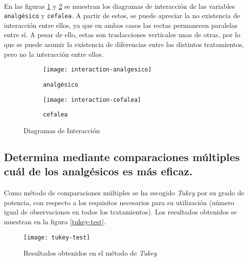 \documentclass[11pt]{article}
\begin{document}
      \paragraph{}
      En las figuras \ref{fig:interaction-analgesico} y \ref{fig:interaction-cefalea} se muestran los diagramas de interacción de las variables \texttt{analgésico} y \texttt{cefalea}. A partir de estos, se puede apreciar la no existencia de interacción entre ellos, ya que en ambos casos las rectas permanecen paralelas entre sí. A pesar de ello, estas son traslacciones verticales unas de otras, por lo que se puede asumir la existencia de diferencias entre las distintos tratamientos, pero no la interacción entre ellos.

      \begin{figure}[!h]
        \centering
        \begin{subfigure}{.5\textwidth}
          \centering
          \texttt{[image: interaction-analgesico]}
          \caption{\texttt{analgésico}}
          \label{fig:interaction-analgesico}
        \end{subfigure}%
        \begin{subfigure}{.5\textwidth}
          \centering
          \texttt{[image: interaction-cefalea]}
          \caption{\texttt{cefalea}}
          \label{fig:interaction-cefalea}
        \end{subfigure}
        \caption{Diagramas de Interacción}
        \label{fig:interaction}
      \end{figure}

    \subsection{Determina mediante comparaciones múltiples cuál de los analgésicos es más eficaz.}

      \paragraph{}
      Como método de comparaciones múltiples se ha escogido \emph{Tukey} por su grado de potencia, con respecto a los requisitos necesarios para su utilización (número igual de observaciones en todos los tratamientos). Los resultados obtenidos se muestran en la figura \ref{tukey-test}.

      \begin{figure}[!h]
        \centering
        \texttt{[image: tukey-test]}
        \caption{Resultados obtenidos en el método de \emph{Tukey}}
        \label{fig:1f1b-anova-tukey-results}
      \end{figure}
\end{document}
